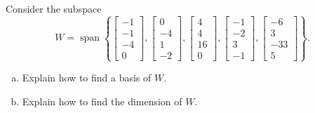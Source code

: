 
\begin{exerciseStatement}


Consider the subspace \[W=\operatorname{span}  \left\{ \left[\begin{array}{c}
-1 \\
-1 \\
-4 \\
0
\end{array}\right] , \left[\begin{array}{c}
0 \\
-4 \\
1 \\
-2
\end{array}\right] , \left[\begin{array}{c}
4 \\
4 \\
16 \\
0
\end{array}\right] , \left[\begin{array}{c}
-1 \\
-2 \\
3 \\
-1
\end{array}\right] , \left[\begin{array}{c}
-6 \\
3 \\
-33 \\
5
\end{array}\right] \right\} .\]


\begin{enumerate}[(a)]
\item  Explain how to find a basis of \(W\).
\item  Explain how to find the dimension of \(W\).
\end{enumerate}
    
\end{exerciseStatement}
    
